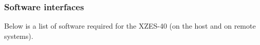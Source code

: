 
\subsubsection{Software interfaces}

Below is a list of software required for the XZES-40 (on the host and on remote systems).

